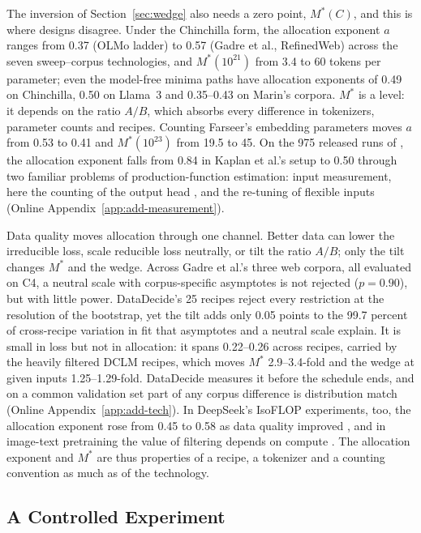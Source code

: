 The inversion of Section~\ref{sec:wedge} also needs a zero point, $M^*(C)$, and this is where designs disagree. Under
the Chinchilla form, the allocation exponent $a$ ranges from 0.37 (OLMo ladder) to 0.57 (Gadre et al., RefinedWeb)
across the seven sweep--corpus technologies, and $M^*(10^{21})$ from 3.4 to 60 tokens per parameter; even the
model-free minima paths have allocation exponents of 0.49 on Chinchilla, 0.50 on Llama~3 and 0.35--0.43 on Marin's
corpora. $M^*$ is a level: it depends on the ratio $A/B$, which absorbs every difference in tokenizers, parameter counts
and recipes. Counting Farseer's embedding parameters moves $a$ from 0.53 to 0.41 and $M^*(10^{23})$ from 19.5 to 45. On
the 975 released runs of \citet{porian2024resolving}, the allocation exponent falls from 0.84 in Kaplan et al.'s setup
to 0.50 through two familiar problems of production-function estimation: input measurement, here the counting of the
output head \citep{collardwexler2016production}, and the re-tuning of flexible inputs
\citep{ackerberg2015identification,gandhi2020identification} (Online Appendix~\ref{app:add-measurement}).

Data quality moves allocation through one channel. Better data can lower the irreducible loss, scale reducible loss
neutrally, or tilt the ratio $A/B$; only the tilt changes $M^*$ and the wedge. Across Gadre et al.'s three web corpora,
all evaluated on C4, a neutral scale with corpus-specific asymptotes is not rejected ($p=0.90$), but with little power.
DataDecide's 25 recipes reject every restriction at the resolution of the bootstrap, yet the tilt adds only 0.05 points
to the 99.7 percent of cross-recipe variation in fit that asymptotes and a neutral scale explain. It is small in loss
but not in allocation: it spans 0.22--0.26 across recipes, carried by the heavily filtered DCLM recipes, which moves
$M^*$ 2.9--3.4-fold and the wedge at given inputs 1.25--1.29-fold. DataDecide measures it before the schedule ends, and
on a common validation set part of any corpus difference is distribution match (Online Appendix~\ref{app:add-tech}). In
DeepSeek's IsoFLOP experiments, too, the allocation exponent rose from 0.45 to 0.58 as data quality improved
\citep{bi2024deepseek}, and in image-text pretraining the value of filtering depends on compute
\citep{goyal2024scaling}. The allocation exponent and $M^*$ are thus properties of a recipe, a tokenizer and a counting
convention as much as of the technology.

\subsection{A Controlled Experiment}\label{sec:tech:experiment}

